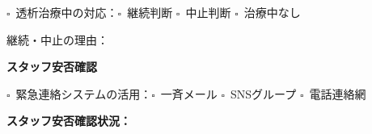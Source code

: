 \documentclass[a4paper,12pt]{jarticle}
\newcommand{\checkbox}{$\square$\ }
\newcommand{\underlinespace}[1]{\underline{\hspace{#1}}}
\begin{document}
\vspace{3mm}

\noindent
\checkbox 透析治療中の対応：\checkbox 継続判断 \quad \checkbox 中止判断 \quad \checkbox 治療中なし

\vspace{2mm}

\noindent
継続・中止の理由：\underlinespace{10cm}

\vspace{8mm}

\begin{center}
\textbf{\large スタッフ安否確認}
\end{center}

\vspace{3mm}

\noindent
\checkbox 緊急連絡システムの活用：\checkbox 一斉メール \quad \checkbox SNSグループ \quad \checkbox 電話連絡網

\vspace{3mm}

\noindent
\textbf{スタッフ安否確認状況：}

\vspace{3mm}
\end{document}
